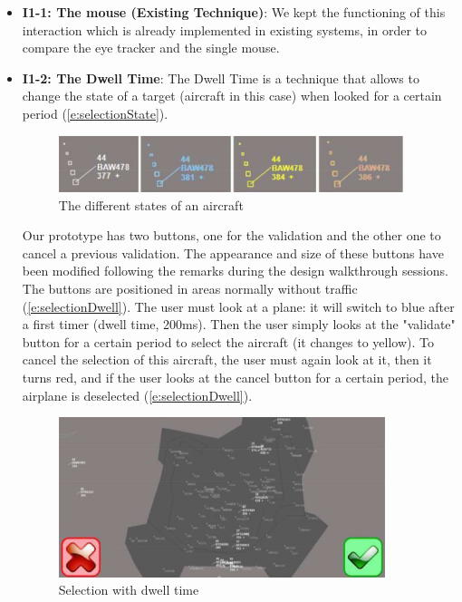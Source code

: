 \begin{itemize}

\item \textbf{I1-1: The mouse (Existing Technique)}: We kept the functioning of this interaction which is already
implemented in existing systems, in order to compare the eye tracker and the single mouse. 

\item \textbf{I1-2: The Dwell Time}: The Dwell Time is a technique that allows to change the state of a target (aircraft in this case) when looked for a certain period (\autoref{e:selectionState}).
\begin{figure}
 \centering
	\includegraphics[width=0.95\textwidth]{Figures/selectionState.png}
	\caption{ The different states of an aircraft}
	\label{e:selectionState}
\end{figure}

Our prototype has two buttons, one for the validation and the
other one to cancel a previous validation. The appearance
and size of these buttons have been modified following the
remarks during the design walkthrough sessions. The
buttons are positioned in areas normally without traffic
(\autoref{e:selectionDwell}). The user must look at a plane: it will switch to
blue after a first timer (dwell time, 200ms). Then the user
simply looks at the "validate" button for a certain period to
select the aircraft (it changes to yellow). To cancel the
selection of this aircraft, the user must again look at it, then it turns red, and if the user looks at the cancel
button for a certain period, the airplane is deselected (\autoref{e:selectionDwell}).

\begin{figure}
 \centering
	\includegraphics[width=0.90\textwidth]{Figures/selectionDwell.png}
	\caption{ Selection with dwell time}
	\label{e:selectionDwell}
\end{figure}


\end{itemize}
